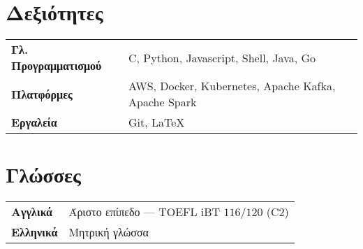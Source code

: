 \documentclass[margin, 12pt]{resume}
\newcommand{\sectionVSpace}{\vspace{-3.5ex}} %
\newcommand{\rSection}[1]{\sectionVSpace\section{#1}\xspace}
\newcommand{\project}[2]{\textbf{\href{#2}{#1}}}
\begin{document}
\begin{resume}
    \rSection{Δεξιότητες}

    \begin{tabular}{@{} >{\bfseries}l l @{}}
        Γλ. Προγραμματισμού & C, Python, Javascript, Shell, Java, Go              \\
        Πλατφόρμες          & AWS, Docker, Kubernetes, Apache Kafka, Apache Spark \\
        Εργαλεία            & Git, LaTeX
    \end{tabular}

    \vspace{1ex}

    \section{Γλώσσες}

    \begin{tabular}{@{} >{\bfseries}l l @{}}
        Αγγλικά  & Άριστο επίπεδο --- TOEFL iBT \( 116/120 \) (C2) \\
        Ελληνικά & Μητρική γλώσσα                                  \\
    \end{tabular}







\end{resume}
\end{document}
